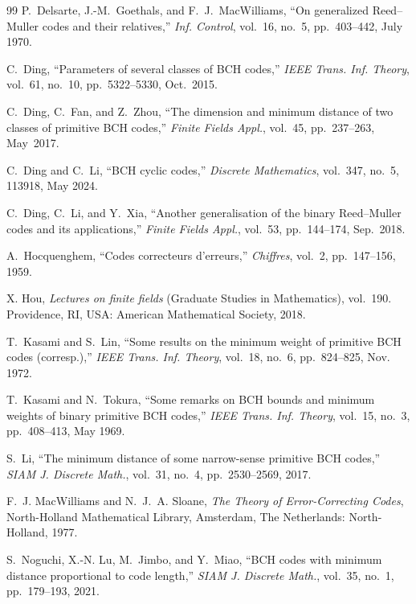 \documentclass[journal,onecolumn]{IEEEtran}
\begin{document}
\begin{thebibliography}{99}
P.~Delsarte, J.-M.~Goethals, and F.~J.~MacWilliams,
``On generalized Reed--Muller codes and their relatives,''
\emph{Inf. Control},
vol.~16, no.~5, pp.~403--442, July 1970.




C.~Ding, ``Parameters of several classes of BCH codes,'' \emph{IEEE Trans. Inf. Theory}, vol.~61, no.~10, pp.~5322--5330, Oct.~2015.



C.~Ding, C.~Fan, and Z.~Zhou, ``The dimension and minimum distance of two classes of primitive BCH codes,'' \emph{Finite Fields Appl.}, vol.~45, pp.~237--263, May~2017.

C.~Ding and C.~Li, ``BCH cyclic codes,'' {\em Discrete Mathematics}, vol.~347,
  no.~5, 113918, May 2024.



C.~Ding, C.~Li, and Y.~Xia,
``Another generalisation of the binary Reed--Muller codes and its
applications,''
\emph{Finite Fields Appl.},
vol.~53, pp.~144--174, Sep.~2018.



A.~Hocquenghem, ``Codes correcteurs d'erreurs,'' {\em{Chiffres}}, vol.~2,
  pp.~147--156, 1959.


X.  Hou, {\em Lectures on finite fields} (Graduate Studies in Mathematics), vol.~190.
Providence, RI, USA: American Mathematical Society, 2018.




T.~Kasami and S.~Lin, ``Some results on the minimum weight of primitive BCH 
  codes (corresp.),'' {\em IEEE Trans. Inf. Theory}, vol.~18,
  no.~6, pp.~824--825, Nov. 1972.

T.~Kasami and N.~Tokura,
``Some remarks on BCH bounds and minimum weights of binary primitive BCH codes,''
\emph{IEEE Trans. Inf. Theory}, vol.~15, no.~3, pp.~408--413, May 1969.

S.~Li, ``The minimum distance of some narrow-sense primitive BCH codes,''
\emph{SIAM J. Discrete Math.}, vol.~31, no.~4, pp.~2530--2569, 2017.

F.~J. MacWilliams and N.~J.~A. Sloane,
\emph{The Theory of Error-Correcting Codes}, North-Holland Mathematical
Library, Amsterdam, The Netherlands: North-Holland, 1977.


S.~Noguchi, X.-N. Lu, M.~Jimbo, and Y.~Miao, ``BCH codes with minimum distance
  proportional to code length,'' {\em SIAM J. Discrete Math.},
  vol.~35, no.~1, pp.~179--193, 2021.




\end{thebibliography}
\end{document}
